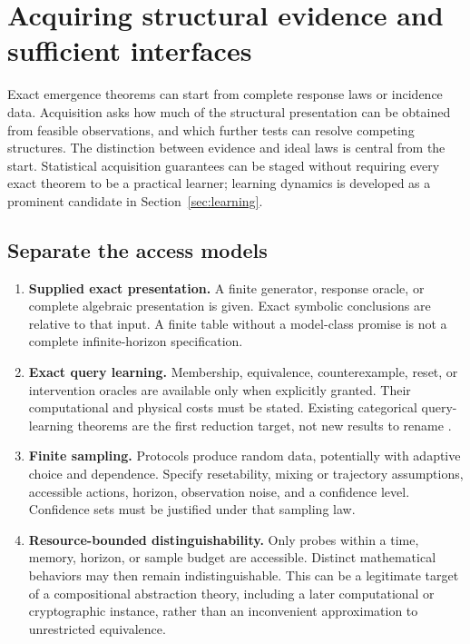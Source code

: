 \documentclass[11pt]{article}
\theoremstyle{remark}
\begin{document}
\section{Acquiring structural evidence and sufficient interfaces}
\label{sec:acquisition}

Exact emergence theorems can start from complete response laws or incidence data. Acquisition asks how much of the structural presentation can be obtained from feasible observations, and which further tests can resolve competing structures. The distinction between evidence and ideal laws is central from the start. Statistical acquisition guarantees can be staged without requiring every exact theorem to be a practical learner; learning dynamics is developed as a prominent candidate in Section~\ref{sec:learning}.

\subsection{Separate the access models}

\begin{enumerate}
\item \textbf{Supplied exact presentation.} A finite generator, response oracle, or complete algebraic presentation is given. Exact symbolic conclusions are relative to that input. A finite table without a model-class promise is not a complete infinite-horizon specification.
\item \textbf{Exact query learning.} Membership, equivalence, counterexample, reset, or intervention oracles are available only when explicitly granted. Their computational and physical costs must be stated. Existing categorical query-learning theorems are the first reduction target, not new results to rename \cite{CALF,FunctorialLearning}.
\item \textbf{Finite sampling.} Protocols produce random data, potentially with adaptive choice and dependence. Specify resetability, mixing or trajectory assumptions, accessible actions, horizon, observation noise, and a confidence level. Confidence sets must be justified under that sampling law.
\item \textbf{Resource-bounded distinguishability.} Only probes within a time, memory, horizon, or sample budget are accessible. Distinct mathematical behaviors may then remain indistinguishable. This can be a legitimate target of a compositional abstraction theory, including a later computational or cryptographic instance, rather than an inconvenient approximation to unrestricted equivalence.
\end{enumerate}
\end{document}
